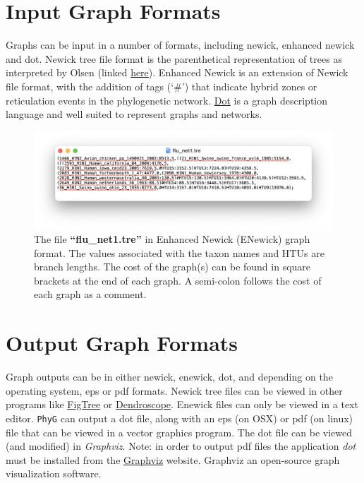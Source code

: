 \documentclass[11pt]{book}
\newcommand{\phyg}{\texttt{PhyG} }
\begin{document}
{{\section{Input Graph Formats}
	Graphs can be input in a number of formats, including newick, enhanced newick and 
	dot. Newick tree file format is the parenthetical representation of trees as interpreted 
	by Olsen (linked \href{https://evolution.genetics.washington.edu/phylip/newick_doc.html}
	{here}). Enhanced Newick \cite{Cardonaetal2008} is an extension of Newick file 
	format, with the addition of tags (`\#') that indicate hybrid zones or reticulation events
	in the phylogenetic network. \href{https://graphviz.org/}{Dot} is a graph description 
	language and well suited to represent graphs and networks. 	
	
	\begin{figure}%
	\centering
	\includegraphics[width=\textwidth]{enewick.png}
	\caption{The file \textbf{``flu\_net1.tre''} in Enhanced Newick (ENewick) graph format. The 
	values associated with the taxon names and HTUs are branch lengths. The cost of the 
	graph(s) can be found in square brackets at the end of each graph. A semi-colon follows
	the cost of each graph as a comment.}
	\label{enewick}
	\end{figure}
	
\section{Output Graph Formats}
\label{sec:outputgraphs}
	Graph outputs can be in either newick, enewick, dot, and depending on the 
	operating system, eps or pdf formats. Newick tree files can be viewed in other 
	programs like \href{http://tree.bio.ed.ac.uk/software/figtree/}{FigTree} or 	
	\href{http:/https://uni-tuebingen.de/fakultaeten/mathematisch-naturwissenschaftliche-fakultaet/fachbereiche/informatik/lehrstuehle/algorithms-in-bioinformatics/software/}{Dendroscope}. 
	Enewick files can only be viewed in a text editor. \phyg can output a dot file, 
	along with an eps (on OSX) or pdf (on linux) file that can be viewed in a vector 
	graphics program. The dot file can be viewed (and modified) in \textit{Graphviz}. 
	Note: in order to output pdf files the application \textit{dot} must be installed from 
	the \href{https://graphviz.org/download/}{Graphviz} website. Graphviz an open-source
	graph visualization software. \\	
	
}}
\end{document}
